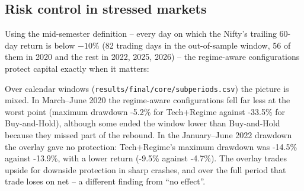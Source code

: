 \documentclass[11pt,a4paper]{article}
\begin{document}
\subsection{Risk control in stressed markets}
Using the mid-semester definition -- every day on which the Nifty's trailing 60-day return is below $-10\%$ (82 trading days in the out-of-sample window, 56 of them in 2020 and the rest in 2022, 2025, 2026) -- the regime-aware configurations protect capital exactly when it matters:
\begin{table}[H]
\centering
\small
\caption{Maximum drawdown over crash-regime days only (core universe).}\label{tab:crash}
\end{table}

Over calendar windows (\texttt{results/final/core/subperiods.csv}) the picture is mixed. In March--June 2020 the regime-aware configurations fell far less at the worst point (maximum drawdown -5.2\% for Tech+Regime against -33.5\% for Buy-and-Hold), although some ended the window lower than Buy-and-Hold because they missed part of the rebound. In the January--June 2022 drawdown the overlay gave no protection: Tech+Regime's maximum drawdown was -14.5\% against -13.9\%, with a lower return (-9.5\% against -4.7\%). The overlay trades upside for downside protection in sharp crashes, and over the full period that trade loses on net -- a different finding from ``no effect''.
\end{document}
